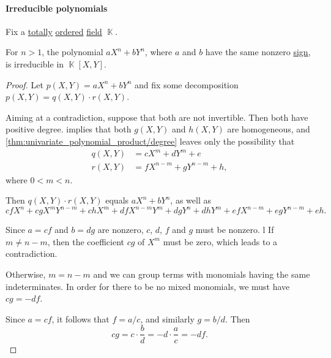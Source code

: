 \paragraph{Irreducible polynomials}

\begin{proposition}\label{thm:axn_byn_irreducible}
  Fix a \hyperref[def:totally_ordered_set]{totally} \hyperref[def:ordered_semiring]{ordered} \hyperref[def:field]{field} \( \BbbK \).

  For \( n > 1 \), the polynomial \( a X^n + b Y^n \), where \( a \) and \( b \) have the same nonzero \hyperref[def:signum]{sign}, is irreducible in \( \BbbK[X, Y] \).
\end{proposition}
\begin{proof}
  Let \( p(X, Y) = a X^n + b Y^n \) and fix some decomposition \( p(X, Y) = q(X, Y) \cdot r(X, Y) \).

  Aiming at a contradiction, suppose that both are not invertible. Then both have positive degree.  implies that both \( g(X, Y) \) and \( h(X, Y) \) are homogeneous, and \cref{thm:univariate_polynomial_product/degree} leaves only the possibility that
  \begin{align*}
    q(X, Y) &= c X^m + d Y^m + e \\
    r(X, Y) &= f X^{n-m} + g Y^{n-m} + h,
  \end{align*}
  where \( 0 < m < n \).

  Then \( q(X, Y) \cdot r(X, Y) \) equals \( a X^n + b Y^n \), as well as
  \begin{equation*}
    c f X^n + c g X^m Y^{n-m} + c h X^m + d f X^{n-m} Y^m + d g Y^n + d h Y^m + e f X^{n-m} + e g Y^{n-m} + e h.
  \end{equation*}

  Since \( a = c f \) and \( b = d g \) are nonzero, \( c \), \( d \), \( f \) and \( g \) must be nonzero.
l
  If \( m \neq n - m \), then the coefficient \( c g \) of \( X^m \) must be zero, which leads to a contradiction.

  Otherwise, \( m = n - m \) and we can group terms with monomials having the same indeterminates. In order for there to be no mixed monomials, we must have \( c g = - d f \).

  Since \( a = c f \), it follows that \( f = a / c \), and similarly \( g = b / d \). Then
  \begin{equation*}
    c g = c \cdot \frac b d = - d \cdot \frac a c = - d f.
  \end{equation*}


\end{proof}
